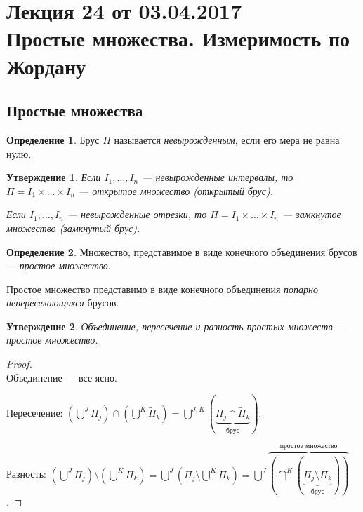 \documentclass[a4paper,12pt]{article}
\theoremstyle{remark}
\theoremstyle{definition}
\newtheorem{Def}{Определение}
\theoremstyle{plain}
\newtheorem*{Statement}{Утверждение}
\newcommand{\0}{\vec{0}}
\newcommand{\PPi}{\widetilde{\Pi}}
\begin{document}
\pagestyle{fancy}
\section{Лекция 24 от 03.04.2017 \\ Простые множества. Измеримость по Жордану}

\subsection{Простые множества}

\begin{Def}
Брус $\Pi$ называется \textit{невырожденным}, если его мера не равна нулю.
\end{Def}

\begin{Statement}
Если $I_1, \ldots, I_n$ --- невырожденные интервалы, то $\Pi = I_1 \times \ldots \times I_n$ --- открытое множество (открытый брус).

Если $I_1, \ldots, I_n$ --- невырожденные отрезки, то $\Pi = I_1 \times \ldots \times I_n$ --- замкнутое множество (замкнутый брус).
\end{Statement}

\begin{Def}
Множество, представимое в виде конечного объединения брусов --- \textit{простое множество}.

Простое множество представимо в виде конечного объединения \textit{попарно непересекающихся} брусов.
\end{Def}

\begin{Statement}
Объединение, пересечение и разность простых множеств --- простое множество.
\end{Statement}

\begin{proof}\ \\
Объединение --- все ясно.

Пересечение: $\left( \bigcup\limits^J\Pi_j \right) \cap \left( \bigcup\limits^K\PPi_k \right) = \bigcup\limits^{J, K}\left(\underbrace{\Pi_j \cap \PPi_k}_{\text{брус}} \right)$.

Разность: $\left( \bigcup\limits^J\Pi_j \right) \setminus \left( \bigcup\limits^K\PPi_k \right) = \bigcup\limits^{J}\left( \Pi_j \setminus \bigcup\limits^K\PPi_k \right) = \bigcup\limits^J \overbrace{\left( \bigcap\limits^K\left(\underbrace{\Pi_j \setminus \PPi_k}_{\text{брус}} \right) \right)}^{\text{простое множество}}$.
\end{proof}
\end{document}
